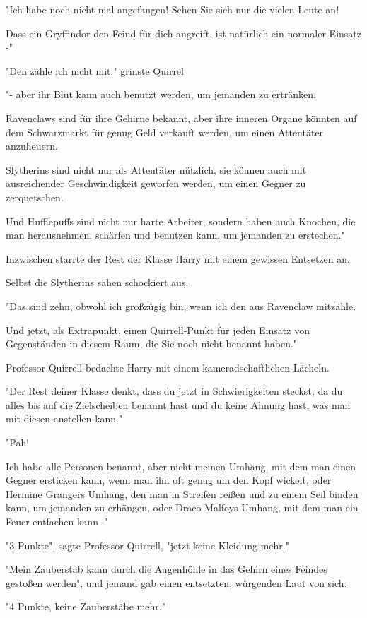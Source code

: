 {"Ich habe noch nicht mal angefangen! Sehen Sie sich nur die vielen Leute an!

Dass ein Gryffindor den Feind für dich angreift, ist natürlich ein normaler Einsatz -"

"Den zähle ich nicht mit." grinste Quirrel

"- aber ihr Blut kann auch benutzt werden, um jemanden zu ertränken.

Ravenclaws sind für ihre Gehirne bekannt, aber ihre inneren Organe könnten auf dem Schwarzmarkt für genug Geld verkauft werden, um einen Attentäter anzuheuern.

Slytherins sind nicht nur als Attentäter nützlich, sie können auch mit ausreichender Geschwindigkeit geworfen werden, um einen Gegner zu zerquetschen.

Und Hufflepuffs sind nicht nur harte Arbeiter, sondern haben auch Knochen, die man herausnehmen, schärfen und benutzen kann, um jemanden zu erstechen."

Inzwischen starrte der Rest der Klasse Harry mit einem gewissen Entsetzen an.

Selbst die Slytherins sahen schockiert aus.

"Das sind zehn, obwohl ich großzügig bin, wenn ich den aus Ravenclaw mitzähle.

Und jetzt, als Extrapunkt, einen Quirrell-Punkt für jeden Einsatz von Gegenständen in diesem Raum, die Sie noch nicht benannt haben."

Professor Quirrell bedachte Harry mit einem kameradschaftlichen Lächeln.

"Der Rest deiner Klasse denkt, dass du jetzt in Schwierigkeiten steckst, da du alles bis auf die Zielscheiben benannt hast und du keine Ahnung hast, was man mit diesen anstellen kann."

"Pah!

Ich habe alle Personen benannt, aber nicht meinen Umhang, mit dem man einen Gegner ersticken kann, wenn man ihn oft genug um den Kopf wickelt, oder Hermine Grangers Umhang, den man in Streifen reißen und zu einem Seil binden kann, um jemanden zu erhängen, oder Draco Malfoys Umhang, mit dem man ein Feuer entfachen kann -"

"3 Punkte", sagte Professor Quirrell, "jetzt keine Kleidung mehr."

"Mein Zauberstab kann durch die Augenhöhle in das Gehirn eines Feindes gestoßen werden", und jemand gab einen entsetzten, würgenden Laut von sich.

"4 Punkte, keine Zauberstäbe mehr."

}

